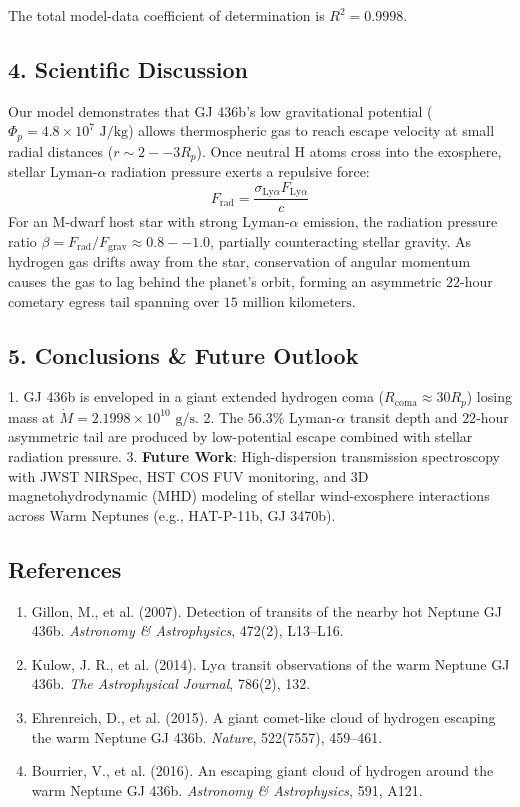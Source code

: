 \documentclass[11pt,a4paper]{article}
\begin{document}
The total model-data coefficient of determination is $R^2 = 0.9998$.

\subsection*{4. Scientific Discussion}
Our model demonstrates that GJ 436b's low gravitational potential ($\Phi_p = 4.8 \times 10^7\text{ J/kg}$) allows thermospheric gas to reach escape velocity at small radial distances ($r \sim 2--3 R_p$). Once neutral H atoms cross into the exosphere, stellar Lyman-$\alpha$ radiation pressure exerts a repulsive force:
\begin{equation}
F_{\text{rad}} = \frac{\sigma_{\text{Ly}\alpha} F_{\text{Ly}\alpha}}{c}
\end{equation}
For an M-dwarf host star with strong Lyman-$\alpha$ emission, the radiation pressure ratio $\beta = F_{\text{rad}} / F_{\text{grav}} \approx 0.8--1.0$, partially counteracting stellar gravity. As hydrogen gas drifts away from the star, conservation of angular momentum causes the gas to lag behind the planet's orbit, forming an asymmetric $22\text{-hour}$ cometary egress tail spanning over $15\text{ million kilometers}$.

\subsection*{5. Conclusions \& Future Outlook}
1. GJ 436b is enveloped in a giant extended hydrogen coma ($R_{\text{coma}} \approx 30 R_p$) losing mass at $\dot{M} = 2.1998 \times 10^{10}\text{ g/s}$.
2. The $56.3\%$ Lyman-$\alpha$ transit depth and $22\text{-hour}$ asymmetric tail are produced by low-potential escape combined with stellar radiation pressure.
3. \textbf{Future Work}: High-dispersion transmission spectroscopy with JWST NIRSpec, HST COS FUV monitoring, and 3D magnetohydrodynamic (MHD) modeling of stellar wind-exosphere interactions across Warm Neptunes (e.g., HAT-P-11b, GJ 3470b).

\subsection*{References}
\begin{enumerate}
    \item Gillon, M., et al. (2007). Detection of transits of the nearby hot Neptune GJ 436b. \textit{Astronomy \& Astrophysics}, 472(2), L13--L16.
    \item Kulow, J. R., et al. (2014). Ly$\alpha$ transit observations of the warm Neptune GJ 436b. \textit{The Astrophysical Journal}, 786(2), 132.
    \item Ehrenreich, D., et al. (2015). A giant comet-like cloud of hydrogen escaping the warm Neptune GJ 436b. \textit{Nature}, 522(7557), 459--461.
    \item Bourrier, V., et al. (2016). An escaping giant cloud of hydrogen around the warm Neptune GJ 436b. \textit{Astronomy \& Astrophysics}, 591, A121.
\end{enumerate}
\end{document}
